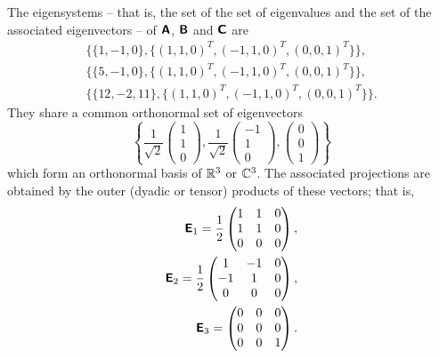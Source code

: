 {The eigensystems -- that is, the set of the set of eigenvalues and the set of the associated eigenvectors -- of $\textsf{\textbf{A}}$,
$\textsf{\textbf{B}}$
and
$\textsf{\textbf{C}}$
are
\begin{equation}
\begin{split}
\{\{1,-1,  0\}, \{(1, 1, 0)^T, (-1, 1, 0)^T, (0, 0, 1)^T\}\} ,\\
\{\{5, -1, 0\},  \{(1, 1, 0)^T, (-1, 1, 0)^T, (0, 0, 1)^T\}\},\\
\{\{12, -2, 11\},  \{(1, 1, 0)^T, (-1, 1, 0)^T, (0, 0, 1)^T\}\}.
\end{split}
\end{equation}
They share a common orthonormal set of eigenvectors
$$
\left\{
\frac{1}{\sqrt{2}}
\begin{pmatrix}
1\\ 1\\ 0
\end{pmatrix},
\frac{1}{\sqrt{2}}
\begin{pmatrix}
-1\\ 1\\ 0
\end{pmatrix},
\begin{pmatrix}
0\\ 0\\ 1\end{pmatrix}
\right\}
$$
which form an orthonormal basis of ${\Bbb R}^3$ or ${\Bbb C}^3$.
The associated projections are obtained by the outer (dyadic or tensor) products
of these vectors; that is,
\begin{equation}
\begin{split}
\textsf{\textbf{E}}_1= \frac{1}{2}
\begin{pmatrix}
1& 1& 0\\
1& 1& 0\\
0& 0& 0
\end{pmatrix},\\
\textsf{\textbf{E}}_2= \frac{1}{2}
\begin{pmatrix}
1& -1& 0\\
-1& 1& 0\\
0& 0& 0
\end{pmatrix},\\
\textsf{\textbf{E}}_3=
\begin{pmatrix}
0& 0& 0\\
0& 0& 0\\
0& 0& 1
\end{pmatrix}.
\end{split}

\end{equation}}
